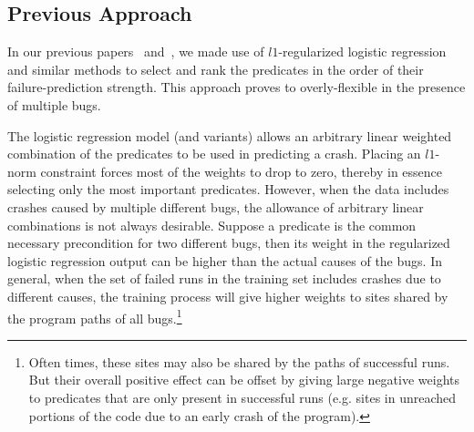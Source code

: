 

\subsection{Previous Approach}
In our previous papers~\cite{Zheng:2003:SDSP} and~\cite{PLDI`03*141},
we made use of $l1$-regularized logistic regression and similar
methods to select and rank the predicates in the order of their
failure-prediction strength.  This approach proves to overly-flexible
in the presence of multiple bugs.

The logistic regression model (and variants) allows an arbitrary
linear weighted combination of the predicates to be used in predicting
a crash.  Placing an $l1$-norm constraint forces most of the weights
to drop to zero, thereby in essence selecting only the most
important predicates.  However, when the data includes crashes caused
by multiple different bugs, the allowance of arbitrary linear
combinations is not always desirable.  Suppose a predicate is the
common necessary precondition for two different bugs, then its weight
in the regularized logistic regression output can be higher than the
actual causes of the bugs.  In general, when the set of failed runs in
the training set includes crashes due to different causes, the
training process will give higher weights to sites shared by the
program paths of all bugs.\footnote{Often times, these sites may also be
shared by the paths of successful runs.  But their overall positive
effect can be offset by giving large negative weights to predicates
that are only present in successful runs (e.g. sites in unreached
portions of the code due to an early crash of the program).}

